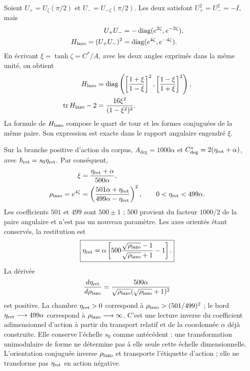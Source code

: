 Soient \(U_+=U_\zeta(\pi/2)\) et
\(U_-=U_{-\zeta}(\pi/2)\). Les deux satisfont
\(U_+^2=U_-^2=-I\), mais
\begin{equation}
 \begin{aligned}
 U_+U_-&=-\operatorname{diag}(e^{2\zeta},e^{-2\zeta}),\\
 H_{\rm lazo}=(U_+U_-)^2
 &=\operatorname{diag}(e^{4\zeta},e^{-4\zeta}).
 \end{aligned}
 \label{md:comp:lazo-diagonal}
\end{equation}
En écrivant \(\xi=\tanh\zeta=C^*/A\), avec les deux angles exprimés
dans la même unité, on obtient
\begin{equation}
 \begin{aligned}
 H_{\rm lazo}
 &=\operatorname{diag}\left(
 \left[\frac{1+\xi}{1-\xi}\right]^2,
 \left[\frac{1-\xi}{1+\xi}\right]^2\right),\\
 \operatorname{tr}H_{\rm lazo}-2
 &=\frac{16\xi^2}{(1-\xi^2)^2}.
 \end{aligned}
 \label{md:comp:lazo-razon-angular}
\end{equation}
La formule de \(H_{\rm lazo}\) compose le quart de tour et les formes
conjuguées de la même paire. Son expression est exacte dans le rapport angulaire
engendré \(\xi\).

Sur la branche positive d’action du corpus,
\(A_{\deg}=1000\alpha\) et
\(C^*_{\deg}=2(\eta_{\rm ret}+\alpha)\), avec
\(\hbar_{\rm ret}=s_0\eta_{\rm ret}\). Par conséquent,
\begin{equation}
 \begin{aligned}
 \xi&=\frac{\eta_{\rm ret}+\alpha}{500\alpha},\\
 \rho_{\rm lazo}=e^{4\zeta}
 &=\left(\frac{501\alpha+\eta_{\rm ret}}
                 {499\alpha-\eta_{\rm ret}}\right)^2,
 \qquad 0<\eta_{\rm ret}<499\alpha.
 \end{aligned}
 \label{md:comp:multiplicador-lazo}
\end{equation}
Les coefficients \(501\) et \(499\) sont \(500\pm1\) ;
\(500\) provient du facteur \(1000/2\) de la paire angulaire et n’est pas un
nouveau paramètre. Les axes orientés étant conservés, la restitution est
\begin{equation}
 \boxed{
 \eta_{\rm ret}=\alpha\left[
 500\frac{\sqrt{\rho_{\rm lazo}}-1}
          {\sqrt{\rho_{\rm lazo}}+1}-1\right].}
 \label{md:comp:restitucion-accion}
\end{equation}
La dérivée
\[
 \frac{d\eta_{\rm ret}}{d\rho_{\rm lazo}}
 =\frac{500\alpha}
 {\sqrt{\rho_{\rm lazo}}(\sqrt{\rho_{\rm lazo}}+1)^2}
\]
est positive. La chambre \(\eta_{\rm ret}>0\) correspond à
\(\rho_{\rm lazo}>(501/499)^2\) ; le bord
\(\eta_{\rm ret}\longrightarrow499\alpha\) correspond à
\(\rho_{\rm lazo}\longrightarrow\infty\).
C’est une lecture inverse du coefficient adimensionnel d’action à partir
du transport relatif et de la coordonnée \(\alpha\) déjà construite.
Elle conserve l’échelle \(s_0\) comme antécédent : une transformation
unimodulaire de forme ne détermine pas à elle seule cette échelle dimensionnelle.
L’orientation conjuguée inverse \(\rho_{\rm lazo}\) et transporte
l’étiquette d’action ; elle ne transforme pas \(\eta_{\rm ret}\) en action négative.


